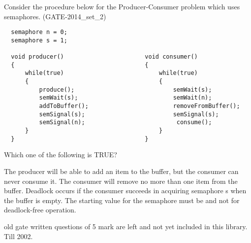 
\begin{questyle}

  \question  Consider the procedure below for the Producer-Consumer problem which uses semaphores. (GATE-2014\_set\_2)
  \begin{lstlisting}
  semaphore n = 0;
  semaphore s = 1;

  void producer()                       void consumer()
  {                                     {
      while(true)                           while(true)
      {                                     {
          produce();                            semWait(s);
          semWait(s);                           semWait(n);
          addToBuffer();                        removeFromBuffer();
          semSignal(s);                         semSignal(s);
          semSignal(n);                          consume();
      }                                     }
  }                                     }
  \end{lstlisting}

    Which one of the following is TRUE?

  \begin{choices}
    \choice  The producer will be able to add an item to the buffer, but the consumer can never consume it.
    \choice  The consumer will remove no more than one item from the buffer.
    \choice  Deadlock occurs if the consumer succeeds in acquiring semaphore s when the buffer is empty.
    \choice  The starting value for the semaphore must be and not for deadlock-free operation.
  \end{choices}

  \end{questyle}




old gate written questions of 5 mark  are left and not yet included in this library. Till 2002.



